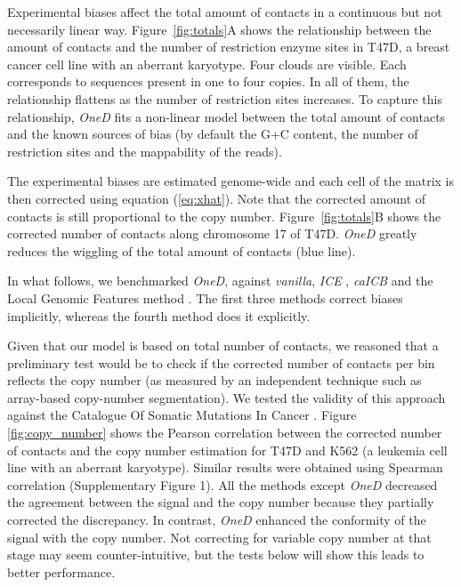 \documentclass{article}
\begin{document}
Experimental biases affect the total amount of contacts in a continuous
but not necessarily linear way. Figure~\ref{fig:totals}A shows the
relationship between the amount of contacts and the number of restriction
enzyme sites in T47D, a breast cancer cell line with an aberrant
karyotype.  Four clouds are visible. Each corresponds to sequences present
in one to four copies. In all of them, the relationship flattens as the
number of restriction sites increases. To capture this
relationship, \textit{OneD} fits a non-linear model between the total
amount of contacts and the known sources of bias (by default the G+C
content, the number of restriction sites and the mappability of the
reads).

The experimental biases are estimated genome-wide and each cell of the
matrix is then corrected using equation (\ref{eq:xhat}). Note that the
corrected amount of contacts is still proportional to the copy number.
Figure~\ref{fig:totals}B shows the corrected number of contacts along
chromosome 17 of T47D. \textit{OneD} greatly reduces the wiggling of the
total amount of contacts (blue line).


In what follows, we benchmarked \textit{OneD}, against \textit{vanilla},
\textit{ICE} \citep{imakaev2012iterative}, \textit{caICB}
\citep{wu2016computational} and the Local Genomic Features method
\citep[\textit{LGF},][]{hu2012hicnorm, servant2012hitc}. The first three
methods correct biases implicitly, whereas the fourth method does it
explicitly.

Given that our model is based on total number of contacts, we reasoned
that a preliminary test would be to check if the corrected number of
contacts per bin reflects the copy number (as measured by an independent
technique such as array-based copy-number segmentation). We tested the
validity of this approach against the Catalogue Of Somatic Mutations In
Cancer \citep[COSMIC,][]{forbes2010cosmic}. Figure \ref{fig:copy_number}
shows the Pearson correlation between the corrected number of contacts and
the copy number estimation for T47D and K562 (a leukemia cell line with an
aberrant karyotype). Similar results were obtained using Spearman
correlation (Supplementary Figure 1).  All the methods except
\textit{OneD} decreased the agreement between the signal and the copy
number because they partially corrected the discrepancy. In contrast,
\textit{OneD} enhanced the conformity of the signal with the copy number.
Not correcting for variable copy number at that stage may seem
counter-intuitive, but the tests below will show this leads to better
performance.
\end{document}
